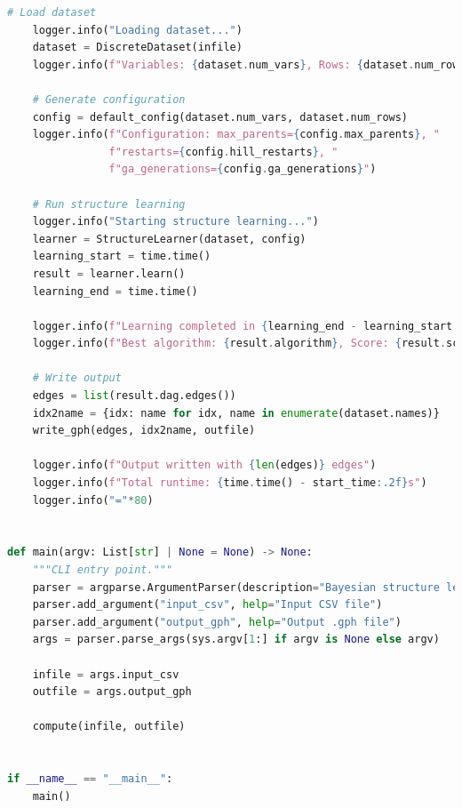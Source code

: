 \documentclass[twoside,11pt]{article}
\begin{document}
\begin{algorithm}
\begin{lstlisting}[language=Python, basicstyle=\tiny\ttfamily, breaklines=true, columns=flexible]
    # Load dataset
    logger.info("Loading dataset...")
    dataset = DiscreteDataset(infile)
    logger.info(f"Variables: {dataset.num_vars}, Rows: {dataset.num_rows}")

    # Generate configuration
    config = default_config(dataset.num_vars, dataset.num_rows)
    logger.info(f"Configuration: max_parents={config.max_parents}, "
                f"restarts={config.hill_restarts}, "
                f"ga_generations={config.ga_generations}")

    # Run structure learning
    logger.info("Starting structure learning...")
    learner = StructureLearner(dataset, config)
    learning_start = time.time()
    result = learner.learn()
    learning_end = time.time()

    logger.info(f"Learning completed in {learning_end - learning_start:.2f}s")
    logger.info(f"Best algorithm: {result.algorithm}, Score: {result.score:.6f}")

    # Write output
    edges = list(result.dag.edges())
    idx2name = {idx: name for idx, name in enumerate(dataset.names)}
    write_gph(edges, idx2name, outfile)

    logger.info(f"Output written with {len(edges)} edges")
    logger.info(f"Total runtime: {time.time() - start_time:.2f}s")
    logger.info("="*80)


def main(argv: List[str] | None = None) -> None:
    """CLI entry point."""
    parser = argparse.ArgumentParser(description="Bayesian structure learning")
    parser.add_argument("input_csv", help="Input CSV file")
    parser.add_argument("output_gph", help="Output .gph file")
    args = parser.parse_args(sys.argv[1:] if argv is None else argv)

    infile = args.input_csv
    outfile = args.output_gph

    compute(infile, outfile)


if __name__ == "__main__":
    main()
\end{lstlisting}
\end{algorithm}
\end{document}

